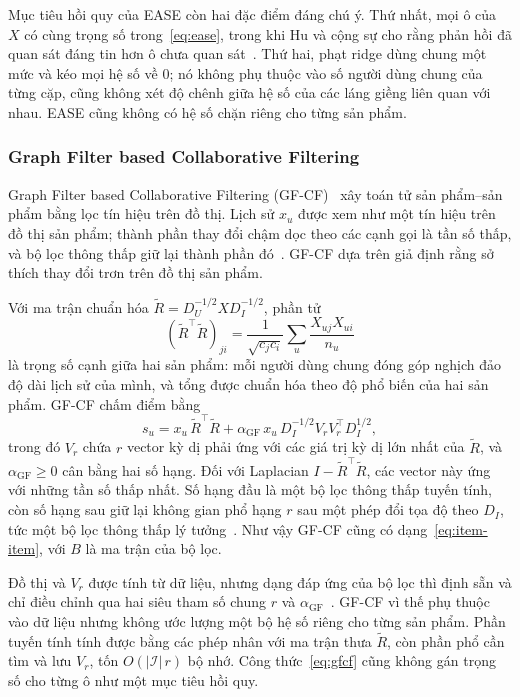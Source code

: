 Mục tiêu hồi quy của EASE còn hai đặc điểm đáng chú ý. Thứ nhất, mọi ô của $X$ có cùng trọng số trong~\eqref{eq:ease}, trong khi Hu và cộng sự cho rằng phản hồi đã quan sát đáng tin hơn ô chưa quan sát~\cite{hu2008wmf}. Thứ hai, phạt ridge dùng chung một mức và kéo mọi hệ số về 0; nó không phụ thuộc vào số người dùng chung của từng cặp, cũng không xét độ chênh giữa hệ số của các láng giềng liên quan với nhau. EASE cũng không có hệ số chặn riêng cho từng sản phẩm.

\subsubsection{Graph Filter based Collaborative Filtering}
\label{sec:gfcf}

Graph Filter based Collaborative Filtering (GF-CF)~\cite{shen2021gfcf} xây toán tử sản phẩm--sản phẩm bằng lọc tín hiệu trên đồ thị. Lịch sử $x_u$ được xem như một tín hiệu trên đồ thị sản phẩm; thành phần thay đổi chậm dọc theo các cạnh gọi là tần số thấp, và bộ lọc thông thấp giữ lại thành phần đó~\cite{shuman2013graph}. GF-CF dựa trên giả định rằng sở thích thay đổi trơn trên đồ thị sản phẩm.

Với ma trận chuẩn hóa $\tilde R=D_U^{-1/2}XD_I^{-1/2}$, phần tử
\[
(\tilde R^\top\tilde R)_{ji}=\frac{1}{\sqrt{c_jc_i}}\sum_{u} \frac{X_{uj}X_{ui}}{n_u}
\]
là trọng số cạnh giữa hai sản phẩm: mỗi người dùng chung đóng góp nghịch đảo độ dài lịch sử của mình, và tổng được chuẩn hóa theo độ phổ biến của hai sản phẩm. GF-CF chấm điểm bằng
\begin{equation}
s_u = x_u\,\tilde R^\top\tilde R + \alpha_{\mathrm{GF}}\, x_u\, D_I^{-1/2} V_r V_r^\top D_I^{1/2},
\label{eq:gfcf}
\end{equation}
trong đó $V_r$ chứa $r$ vector kỳ dị phải ứng với các giá trị kỳ dị lớn nhất của $\tilde R$, và $\alpha_{\mathrm{GF}}\ge0$ cân bằng hai số hạng. Đối với Laplacian $I-\tilde R^\top\tilde R$, các vector này ứng với những tần số thấp nhất. Số hạng đầu là một bộ lọc thông thấp tuyến tính, còn số hạng sau giữ lại không gian phổ hạng $r$ sau một phép đổi tọa độ theo $D_I$, tức một bộ lọc thông thấp lý tưởng~\cite{shen2021gfcf}. Như vậy GF-CF cũng có dạng~\eqref{eq:item-item}, với $B$ là ma trận của bộ lọc.

Đồ thị và $V_r$ được tính từ dữ liệu, nhưng dạng đáp ứng của bộ lọc thì định sẵn và chỉ điều chỉnh qua hai siêu tham số chung $r$ và $\alpha_{\mathrm{GF}}$~\cite{shen2021gfcf}. GF-CF vì thế phụ thuộc vào dữ liệu nhưng không ước lượng một bộ hệ số riêng cho từng sản phẩm. Phần tuyến tính tính được bằng các phép nhân với ma trận thưa $\tilde R$, còn phần phổ cần tìm và lưu $V_r$, tốn $O(|\mathcal{I}|\,r)$ bộ nhớ. Công thức~\eqref{eq:gfcf} cũng không gán trọng số cho từng ô như một mục tiêu hồi quy.

